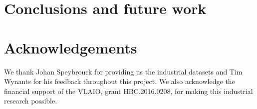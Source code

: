 \documentclass[preprint,12pt]{elsarticle}
\begin{document}
\section{Conclusions and future work}

\section*{Acknowledgements}

We thank Johan Speybrouck for providing us the industrial datasets and Tim Wynants for his feedback throughout this project. We also acknowledge the financial support of the VLAIO, grant HBC.2016.0208, for making this industrial research possible.





%





%
%
%
\end{document}
